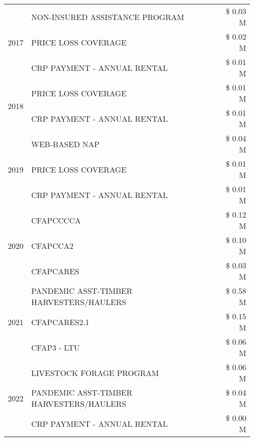 \begin{tabular}{llr}
\cline{1-3}
\multirow[t]{3}{*}{2017} & NON-INSURED ASSISTANCE PROGRAM & \$ 0.03 M \\
 & PRICE LOSS COVERAGE & \$ 0.02 M \\
 & CRP PAYMENT - ANNUAL RENTAL & \$ 0.01 M \\
\cline{1-3}
\multirow[t]{2}{*}{2018} & PRICE LOSS COVERAGE & \$ 0.01 M \\
 & CRP PAYMENT - ANNUAL RENTAL & \$ 0.01 M \\
\cline{1-3}
\multirow[t]{3}{*}{2019} & WEB-BASED NAP & \$ 0.04 M \\
 & PRICE LOSS COVERAGE & \$ 0.01 M \\
 & CRP PAYMENT - ANNUAL RENTAL & \$ 0.01 M \\
\cline{1-3}
\multirow[t]{3}{*}{2020} & CFAPCCCCA & \$ 0.12 M \\
 & CFAPCCA2 & \$ 0.10 M \\
 & CFAPCARES & \$ 0.03 M \\
\cline{1-3}
\multirow[t]{3}{*}{2021} & PANDEMIC ASST-TIMBER HARVESTERS/HAULERS & \$ 0.58 M \\
 & CFAPCARES2.1 & \$ 0.15 M \\
 & CFAP3 - LTU & \$ 0.06 M \\
\cline{1-3}
\multirow[t]{3}{*}{2022} & LIVESTOCK FORAGE PROGRAM & \$ 0.06 M \\
 & PANDEMIC ASST-TIMBER HARVESTERS/HAULERS & \$ 0.04 M \\
 & CRP PAYMENT - ANNUAL RENTAL & \$ 0.00 M \\
\cline{1-3}
\bottomrule
\end{tabular}
